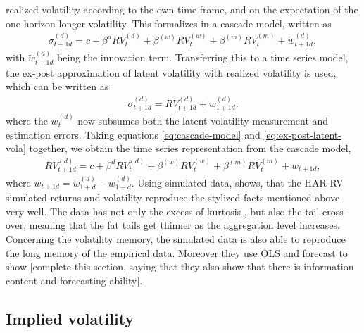 realized volatility according to the own time frame, and on the expectation of the one horizon longer volatility. This formalizes in a cascade model, written as
\begin{align}\label{eq:cascade-model}
\sigma_{t+1d}^{(d)} = c + \beta^{d} RV_{t}^{(d)} + \beta^{(w)} RV_{t}^{(w)} + \beta^{(m)} RV_{t}^{(m)} + \tilde{w}_{t+1d}^{(d)},
\end{align}
with $\tilde{w}_{t+1d}^{(d)}$ being the innovation term.
Transferring this to a time series model, the ex-post approximation of latent volatility with realized volatility is used, which can be written as
\begin{align}\label{eq:ex-post-latent-vola}
\sigma_{t+1d}^{(d)} = RV_{t+1d}^{(d)} + w_{1+1d}^{(d)}.
\end{align}
where the $w_{t}^{(d)}$ now subsumes both the latent volatility measurement and estimation errors.  Taking equations \ref{eq:cascade-model} and \ref{eq:ex-post-latent-vola} together, we obtain the time series representation from the cascade model,
\begin{align}\label{eq:time-series-model}
RV_{t+1d}^{(d)} = c + \beta^{d} RV_{t}^{(d)} + \beta^{(w)} RV_{t}^{(w)} + \beta^{(m)} RV_{t}^{(m)} + w_{t+1d} ,
\end{align}
where $w_{t+1d} = \tilde{w}_{1+d}^{(d)} - w_{1+d}^{(d)}$. 
Using simulated data, \textcite{corsi2009} shows, that the HAR-RV simulated returns and volatility reproduce the stylized facts mentioned above very well. The data has not only the excess of kurtosis , but also the tail cross-over, meaning that the fat tails get thinner as the aggregation level increases. Concerning the volatility memory, the simulated data is also able to reproduce the long memory of the empirical data. Moreover they use OLS and forecast to show [complete this section, saying that they also show that there is information content and forecasting ability].


\subsection{Implied volatility}
